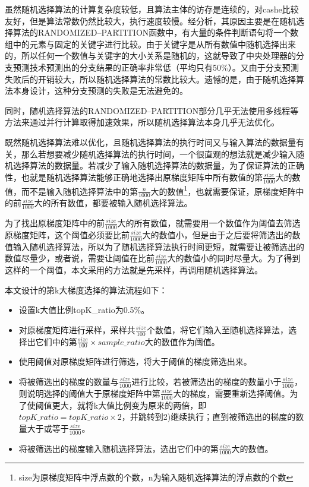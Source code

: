 虽然随机选择算法的计算复杂度较低，且算法主体的访存是连续的，对cashe比较友好，但是算法常数仍然比较大，执行速度较慢。经分析，其原因主要是在随机选择算法的RANDOMIZED--PARTITION函数中，有大量的条件判断语句将一个数组中的元素与固定的关键字进行比较。由于关键字是从所有数值中随机选择出来的，所以任何一个数值与关键字的大小关系是随机的，这就导致了中央处理器的分支预测技术预测出的分支结果的正确率非常低（平均只有50\%）。又由于分支预测失败后的开销较大，所以随机选择算法的常数比较大。遗憾的是，由于随机选择算法本身设计，这种分支预测的失败是无法避免的。

同时，随机选择算法的RANDOMIZED--PARTITION部分几乎无法使用多线程等方法来通过并行计算取得加速效果，所以随机选择算法本身几乎无法优化。

既然随机选择算法难以优化，且随机选择算法的执行时间又与输入算法的数据量有关，那么若想要减少随机选择算法的执行时间，一个很直观的想法就是减少输入随机选择算法的数据量。若减少了输入随机选择算法的数据量，为了保证算法的正确性，也就是随机选择算法能够正确地选择出原梯度矩阵中所有数值的第$\frac{size}{1000}$大的数值，而不是输入随机选择算法中的第$\frac{n}{1000}$大的数值\footnote{size为原梯度矩阵中浮点数的个数，n为输入随机选择算法的浮点数的个数}，也就需要保证，原梯度矩阵中的前$\frac{size}{1000}$大的所有数值，都要被输入随机选择算法。

为了找出原梯度矩阵中的前$\frac{size}{1000}$大的所有数值，就需要用一个数值作为阈值去筛选原梯度矩阵，这个阈值必须要比前$\frac{size}{1000}$大的数值小，但是由于之后要将筛选出的数值输入随机选择算法，所以为了随机选择算法执行时间更短，就需要让被筛选出的数值尽量少，或者说，需要让阈值在比前$\frac{size}{1000}$大的数值小的同时尽量大。为了得到这样的一个阈值，本文采用的方法就是先采样，再调用随机选择算法。

本文设计的第k大梯度选择的算法流程如下：
\begin{itemize}
  \item [1)]
  设置k大值比例topK\_ratio为0.5\%。
  \item [2)]
  对原梯度矩阵进行采样，采样共$\frac{size}{100}$个数值，将它们输入至随机选择算法，选择出它们中的第$\frac{size}{100}\times sample\_ratio$大的数值作为阈值。
  \item [3)]
  使用阈值对原梯度矩阵进行筛选，将大于阈值的梯度筛选出来。
  \item [4)]
  将被筛选出的梯度的数量与$\frac{size}{1000}$进行比较，若被筛选出的梯度的数量小于$\frac{size}{1000}$，则说明选择的阈值大于原梯度矩阵中第$\frac{size}{1000}$大的梯度，需要重新选择阈值。为了使阈值更大，就将k大值比例变为原来的两倍，即$topK\_ratio = topK\_ratio \times 2$，并跳转到2)继续执行；直到被筛选出的梯度的数量大于或等于$\frac{size}{1000}$。
  \item [5)]
  将被筛选出的梯度输入随机选择算法，选出它们中的第$\frac{size}{1000}$大的数值。
\end{itemize}

